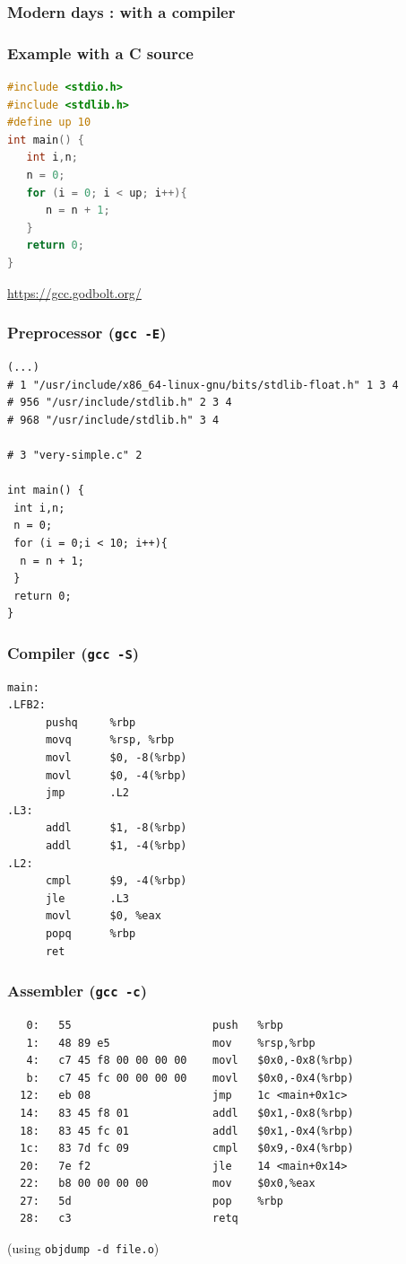 \begin{frame}
\frametitle{Modern days : with a compiler}
\begin{center}
{}
\end{center}
\end{frame}


\begin{frame}[containsverbatim]
\frametitle{Example with a C source}
\begin{lstlisting}[language=C,frame=lines]
#include <stdio.h>
#include <stdlib.h>
#define up 10
int main() {
   int i,n;
   n = 0;
   for (i = 0; i < up; i++){
      n = n + 1;
   }
   return 0;
}
\end{lstlisting}

\url{https://gcc.godbolt.org/}

\end{frame}


\begin{frame}[containsverbatim]
\frametitle{Preprocessor ({\tt gcc -E})}
\begin{verbatim}
(...)
# 1 "/usr/include/x86_64-linux-gnu/bits/stdlib-float.h" 1 3 4
# 956 "/usr/include/stdlib.h" 2 3 4
# 968 "/usr/include/stdlib.h" 3 4

# 3 "very-simple.c" 2

int main() {
 int i,n;
 n = 0;
 for (i = 0;i < 10; i++){
  n = n + 1;
 }
 return 0;
}
\end{verbatim}
\end{frame}


\begin{frame}[containsverbatim]
\frametitle{Compiler ({\tt gcc -S})}
\begin{verbatim}
main:
.LFB2:
      pushq     %rbp
      movq      %rsp, %rbp
      movl      $0, -8(%rbp)
      movl      $0, -4(%rbp)
      jmp       .L2
.L3:
      addl      $1, -8(%rbp)
      addl      $1, -4(%rbp)
.L2:
      cmpl      $9, -4(%rbp)
      jle       .L3
      movl      $0, %eax
      popq      %rbp
      ret
\end{verbatim}
\end{frame}



\begin{frame}[containsverbatim]
\frametitle{Assembler ({\tt gcc -c})}
\begin{verbatim}
   0:	55                   	push   %rbp
   1:	48 89 e5             	mov    %rsp,%rbp
   4:	c7 45 f8 00 00 00 00 	movl   $0x0,-0x8(%rbp)
   b:	c7 45 fc 00 00 00 00 	movl   $0x0,-0x4(%rbp)
  12:	eb 08                	jmp    1c <main+0x1c>
  14:	83 45 f8 01          	addl   $0x1,-0x8(%rbp)
  18:	83 45 fc 01          	addl   $0x1,-0x4(%rbp)
  1c:	83 7d fc 09          	cmpl   $0x9,-0x4(%rbp)
  20:	7e f2                	jle    14 <main+0x14>
  22:	b8 00 00 00 00       	mov    $0x0,%eax
  27:	5d                   	pop    %rbp
  28:	c3                   	retq   
\end{verbatim}
(using {\tt objdump -d file.o})
\end{frame}


